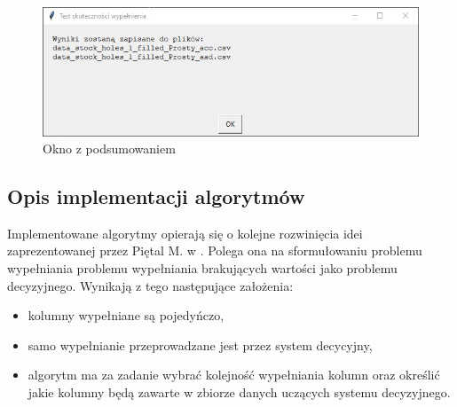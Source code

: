 \documentclass[12pt,twoside]{article}
\begin{document}
\begin{figure}[ht]
	\centering
	\includegraphics[width=12cm]{img/09.jpg}
	\caption{Okno z podsumowaniem}
\label{Fig:acc_end}
\end{figure}
\FloatBarrier

\subsection{Opis implementacji algorytmów}

Implementowane algorytmy opierają się o kolejne rozwinięcia idei zaprezentowanej przez Piętal M. w \cite{wyb_zag}.
Polega ona na sformułowaniu problemu wypełniania problemu wypełniania brakujących wartości jako problemu decyzyjnego.
Wynikają z tego następujące założenia:
\begin{itemize}[label=-,labelsep=0.4cm, leftmargin=1.25cm]
    \item kolumny wypełniane są pojedyńczo,
    \item samo wypełnianie przeprowadzane jest przez system decycyjny,
    \item algorytm ma za zadanie wybrać kolejność wypełniania kolumn oraz
    określić jakie kolumny będą zawarte w zbiorze danych uczących systemu decyzyjnego.
\end{itemize}
\end{document}
